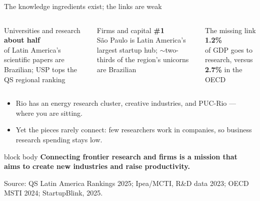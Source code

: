 \documentclass[10pt,aspectratio=169]{beamer}
\newcommand{\source}[1]{%
  \par\vfill{\tiny\color{MidGray}Source: #1}}
\newcommand{\warn}[1]{\textcolor{Brick}{\textbf{#1}}}
\newcommand{\question}[1]{%
  \begin{beamercolorbox}[rounded=true,sep=0.55em,wd=\textwidth]{block body}
    \centering\large\textbf{#1}
  \end{beamercolorbox}}
\begin{document}
\begin{frame}{The knowledge ingredients exist; the links are weak}
  \begin{columns}[T,onlytextwidth]
      \begin{block}{Universities and research}
        \centering
        {\fontsize{26}{30}\selectfont\color{DeepNavy}\textbf{about half}}\\
        of Latin America's scientific papers are Brazilian; USP tops the QS regional ranking
      \end{block}
      \begin{block}{Firms and capital}
        \centering
        {\fontsize{28}{32}\selectfont\color{DeepNavy}\textbf{\#1}}\\
        São Paulo is Latin America's largest startup hub; \(\sim\)two-thirds of the region's unicorns are Brazilian
      \end{block}
      \begin{block}{The missing link}
        \centering
        {\fontsize{28}{32}\selectfont\color{Brick}\textbf{1.2\%}}\\
        of GDP goes to research, versus \warn{2.7\%} in the OECD
      \end{block}
  \end{columns}
  \smallskip
  \begin{itemize}
    \item Rio has an energy research cluster, creative industries, and PUC-Rio --- where you are sitting.
    \item Yet the pieces rarely connect: few researchers work in companies, so business research spending stays low.
  \end{itemize}
  \question{Connecting frontier research and firms is a mission that aims to create new industries and raise productivity.}
  \source{QS Latin America Rankings 2025; Ipea/MCTI, R\&D data 2023; OECD MSTI 2024; StartupBlink, 2025.}
\end{frame}
\end{document}

